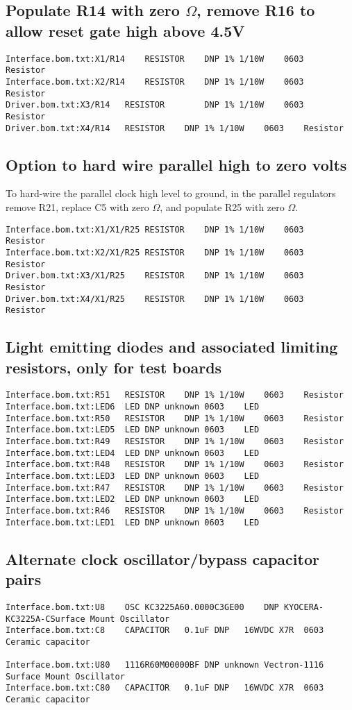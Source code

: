 \documentclass[11pt]{article}
\begin{document}
\subsection{Populate R14 with zero $\Omega$, remove R16 to allow reset gate high above 4.5V}
\begin{verbatim}
Interface.bom.txt:X1/R14	RESISTOR	DNP	1% 1/10W	0603	Resistor	
Interface.bom.txt:X2/R14	RESISTOR	DNP	1% 1/10W	0603	Resistor	
Driver.bom.txt:X3/R14	RESISTOR		DNP	1% 1/10W	0603	Resistor	
Driver.bom.txt:X4/R14	RESISTOR	DNP	1% 1/10W	0603	Resistor	
\end{verbatim}
\subsection{Option to hard wire parallel high to zero volts}

To hard-wire the parallel clock high level to ground, in the parallel regulators
remove R21,
replace C5 with zero $\Omega$, and
populate R25 with zero $\Omega$.

\begin{verbatim}
Interface.bom.txt:X1/X1/R25	RESISTOR	DNP	1% 1/10W	0603	Resistor	
Interface.bom.txt:X2/X1/R25	RESISTOR	DNP	1% 1/10W	0603	Resistor	
Driver.bom.txt:X3/X1/R25	RESISTOR	DNP	1% 1/10W	0603	Resistor	
Driver.bom.txt:X4/X1/R25	RESISTOR	DNP	1% 1/10W	0603	Resistor	
\end{verbatim}

\subsection{Light emitting diodes and associated limiting resistors, only for test boards}
\begin{verbatim}
Interface.bom.txt:R51	RESISTOR	DNP	1% 1/10W	0603	Resistor	
Interface.bom.txt:LED6	LED	DNP	unknown	0603	LED	
Interface.bom.txt:R50	RESISTOR	DNP	1% 1/10W	0603	Resistor	
Interface.bom.txt:LED5	LED	DNP	unknown	0603	LED	
Interface.bom.txt:R49	RESISTOR	DNP	1% 1/10W	0603	Resistor	
Interface.bom.txt:LED4	LED	DNP	unknown	0603	LED	
Interface.bom.txt:R48	RESISTOR	DNP	1% 1/10W	0603	Resistor	
Interface.bom.txt:LED3	LED	DNP	unknown	0603	LED	
Interface.bom.txt:R47	RESISTOR	DNP	1% 1/10W	0603	Resistor	
Interface.bom.txt:LED2	LED	DNP	unknown	0603	LED	
Interface.bom.txt:R46	RESISTOR	DNP	1% 1/10W	0603	Resistor	
Interface.bom.txt:LED1	LED	DNP	unknown	0603	LED	
\end{verbatim}

\subsection{Alternate clock oscillator/bypass capacitor pairs}
\begin{verbatim}
Interface.bom.txt:U8	OSC	KC3225A60.0000C3GE00	DNP	KYOCERA-KC3225A-CSurface Mount Oscillator
Interface.bom.txt:C8	CAPACITOR	0.1uF DNP	16WVDC X7R	0603	Ceramic capacitor	

Interface.bom.txt:U80	1116R60M00000BF	DNP	unknown	Vectron-1116	Surface Mount Oscillator	
Interface.bom.txt:C80	CAPACITOR	0.1uF DNP	16WVDC X7R	0603	Ceramic capacitor	
\end{verbatim}
\end{document}
